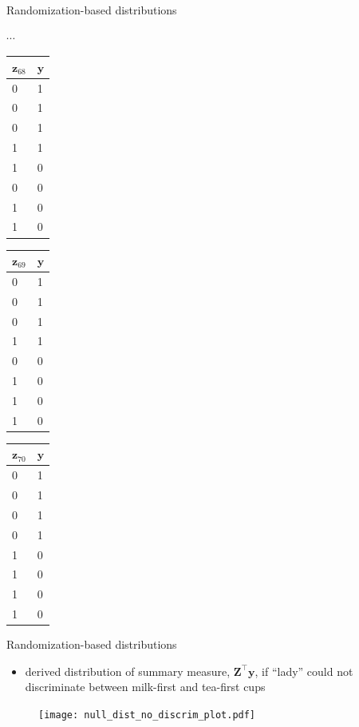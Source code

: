 \documentclass[table, xcolor = {dvipsnames}, 9pt]{beamer}
\theoremstyle{plain}
\begin{document}
\begin{frame}{Randomization-based distributions}
\begin{table}[H]
     \hfill
     $\cdots $
     \hfill
      \begin{tabular}{l|l}
      \toprule
    $\mathbf{z}_{68}$ & $\mathbf{y}$ \\ \midrule
    0 & 1  \\
    0 & 1  \\
    0 & 1  \\
    1 & 1   \\
    1 & 0  \\
    0 & 0  \\
    1 & 0  \\
    1 & 0  
    \end{tabular}
     \hfill
      \begin{tabular}{l|l}
      \toprule
    $\mathbf{z}_{69}$ & $\mathbf{y}$ \\ \midrule
    0 & 1  \\
    0 & 1  \\
    0 & 1  \\
    1 & 1  \\
    0 & 0 \\
    1 & 0  \\
    1 & 0  \\
    1 & 0  
    \end{tabular}
     \hfill
      \begin{tabular}{l|l}
      \toprule
    $\mathbf{z}_{70}$ & $\mathbf{y}$ \\ \midrule
    0 & 1  \\
    0 & 1  \\
    0 & 1  \\
    0 & 1  \\
    1 & 0   \\
    1 & 0  \\
    1 & 0  \\
    1 & 0  
    \end{tabular}
\label{tab: fisher's null pot outs schedule}
\end{table}
\end{frame}
\begin{frame}{Randomization-based distributions}
\vfill
\begin{itemize} \vfill
\item \citet{fisher1935a} derived distribution of summary measure, $\bm{Z}^{\top} \bm{y}$, if ``lady'' could not discriminate between milk-first and tea-first cups \vfill
\end{itemize}  \vfill
\begin{figure}[H]
\texttt{[image: null\_dist\_no\_discrim\_plot.pdf]}
\end{figure} \vfill
\end{frame}
\end{document}
